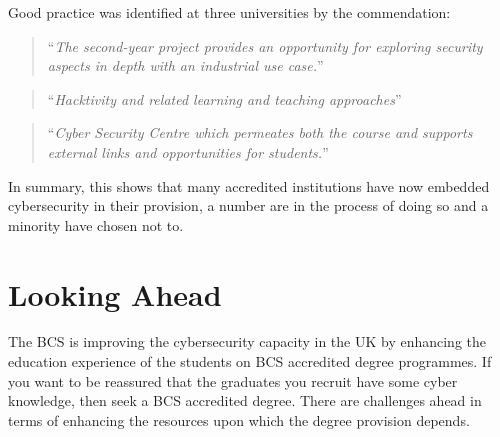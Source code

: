 \documentclass[a4paper,11pt]{article}
\begin{document}
Good practice was identified at three universities by the commendation:

 \begin{quote}
``{\emph{The second-year project provides an opportunity for exploring security aspects in depth with an industrial use case.}}''
\end{quote}
\begin{quote}
``{\emph{Hacktivity and related learning and teaching approaches}}''
\end{quote}
\begin{quote}
``{\emph{Cyber Security Centre which permeates both the course and supports external links and opportunities for students.}}''
\end{quote}

In summary, this shows that many accredited institutions have now embedded cybersecurity in their provision, a number are in the process of doing so and a minority have chosen not to. 

\section*{Looking Ahead}

The BCS is improving the cybersecurity capacity in the UK by enhancing the education experience of the students on BCS accredited degree programmes. If you want to be reassured that the graduates you recruit have some cyber knowledge, then seek a BCS accredited degree. There are challenges ahead in terms of enhancing the resources upon which the degree provision depends.





\end{document}

